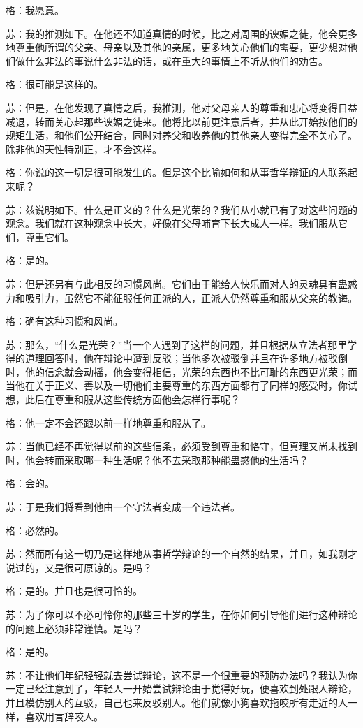 \documentclass[12pt,oneside]{book}
\begin{document}
格：我愿意。

苏：我的推测如下。在他还不知道真情的时候，比之对周围的谀媚之徒，他会更多地尊重他所谓的父亲、母亲以及其他的亲属，更多地关心他们的需要，更少想对他们做什么非法的事说什么非法的话，或在重大的事情上不听从他们的劝告。

格：很可能是这样的。

苏：但是，在他发现了真情之后，我推测，他对父母亲人的尊重和忠心将变得日益减退，转而关心起那些谀媚之徒来。他将比以前更注意后者，并从此开始按他们的规矩生活，和他们公开结合，同时对养父和收养他的其他亲人变得完全不关心了。除非他的天性特别正，才不会这样。

格：你说的这一切是很可能发生的。但是这个比喻如何和从事哲学辩证的人联系起来呢？

苏：兹说明如下。什么是正义的？什么是光荣的？我们从小就已有了对这些问题的观念。我们就在这种观念中长大，好像在父母哺育下长大成人一样。我们服从它们，尊重它们。

格：是的。

苏：但是还另有与此相反的习惯风尚。它们由于能给人快乐而对人的灵魂具有蛊惑力和吸引力，虽然它不能征服任何正派的人，正派人仍然尊重和服从父亲的教诲。

格：确有这种习惯和风尚。

苏：那么，“什么是光荣？”当一个人遇到了这样的问题，并且根据从立法者那里学得的道理回答时，他在辩论中遭到反驳；当他多次被驳倒并且在许多地方被驳倒时，他的信念就会动摇，他会变得相信，光荣的东西也不比可耻的东西更光荣；而当他在关于正义、善以及一切他们主要尊重的东西方面都有了同样的感受时，你试想，此后在尊重和服从这些传统方面他会怎样行事呢？

格：他一定不会还跟以前一样地尊重和服从了。

苏：当他已经不再觉得以前的这些信条，必须受到尊重和恪守，但真理又尚未找到时，他会转而采取哪一种生活呢？他不去采取那种能蛊惑他的生活吗？

格：会的。

苏：于是我们将看到他由一个守法者变成一个违法者。

格：必然的。

苏：然而所有这一切乃是这样地从事哲学辩论的一个自然的结果，并且，如我刚才说过的，又是很可原谅的。是吗？

格：是的。并且也是很可怜的。

苏：为了你可以不必可怜你的那些三十岁的学生，在你如何引导他们进行这种辩论的问题上必须非常谨慎。是吗？

格：是的。

苏：不让他们年纪轻轻就去尝试辩论，这不是一个很重要的预防办法吗？我认为你一定已经注意到了，年轻人一开始尝试辩论由于觉得好玩，便喜欢到处跟人辩论，并且模仿别人的互驳，自己也来反驳别人。他们就像小狗喜欢拖咬所有走近的人一样，喜欢用言辞咬人。
\end{document}
